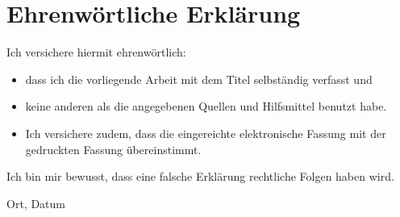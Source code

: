 \clearpage
\chapter*{Ehrenwörtliche Erklärung}	



Ich versichere hiermit ehrenwörtlich: 

\begin{itemize}
	\item dass ich die vorliegende Arbeit mit dem Titel \textit{\DerTitelDerArbeit} selbständig verfasst und
	\item keine anderen als die angegebenen Quellen und Hilfsmittel benutzt habe. 
	\item Ich versichere zudem, dass die eingereichte elektronische Fassung mit der gedruckten Fassung übereinstimmt.
\end{itemize}
Ich bin mir bewusst, dass eine falsche Erklärung rechtliche Folgen haben wird.

\vspace{3cm}
Ort, Datum \hfill \DerAutorDerArbeit 
